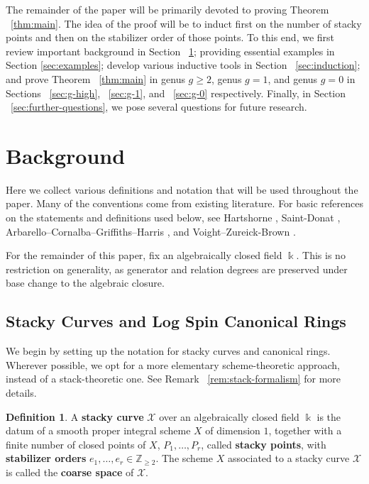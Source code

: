 \documentclass{amsart}
\theoremstyle{plain}
\theoremstyle{definition}
\newtheorem{defn}[thm]{Definition}
\theoremstyle{remark}
\numberwithin{equation}{section}
\newcommand\ssec{\subsection}
\newcommand\BZ{{\mathbb Z}}
\newcommand\Bk{{\Bbbk}}
\newcommand\sx{\mathscr X}
\begin{document}
The remainder of the paper will be primarily devoted to proving
Theorem ~\ref{thm:main}. The idea of the
proof will be to induct first on the number of stacky points and then on the stabilizer order of those points.  To this end, we first review important background in
Section ~\ref{sec:background}; providing essential examples in Section \ref{sec:examples}; develop various inductive
tools in Section ~\ref{sec:induction}; and prove Theorem ~\ref{thm:main} in genus $g\ge 2$, genus $g=1$, and genus $g=0$ in Sections ~\ref{sec:g-high},
~\ref{sec:g-1}, and ~\ref{sec:g-0} respectively.  
Finally, in Section
~\ref{sec:further-questions}, we pose several questions for future
research.


\section{Background}
\label{sec:background}
Here we collect various definitions and notation that will be
used throughout the paper. Many of the conventions come from existing
literature. For basic references on the statements and definitions
used below, see Hartshorne \cite[Chapter IV]{hartshorne:ag},
Saint-Donat \cite{saint-donat:proj}, Arbarello--Cornalba--Griffiths--Harris 
\cite[Section III.2]
{acgh:algebraic-curves}, and Voight--Zureick-Brown \cite[Chapter 2,
Chapter 5]{vzb:stacky}.

For the remainder of this paper, fix an algebraically closed field $\Bk$.
This is no restriction on generality, as generator and relation degrees are preserved under base change to the algebraic closure.

\ssec{Stacky Curves and Log Spin Canonical Rings}
\label{ssec:stacky-background}
We begin by setting up the notation for stacky curves and canonical rings. Wherever possible, we opt for a more elementary scheme-theoretic approach, instead of a stack-theoretic one. See Remark ~\ref{rem:stack-formalism} for more details.

\begin{defn}
\label{defn:stacky-curve}
A \textbf{stacky curve} $\sx$ over an algebraically closed field $\Bk$ is the datum of a smooth proper integral scheme $X$ of dimension $1$, together with a finite number of closed points of $X$, $P_1, \ldots, P_r$, called {\bf stacky points}, with {\bf stabilizer orders} $e_1, \ldots, e_r \in \BZ_{\geq 2}.$ The scheme $X$ associated to a stacky curve $\sx$ is called the {\bf coarse space} of $\sx$.
\end{defn}
\end{document}
